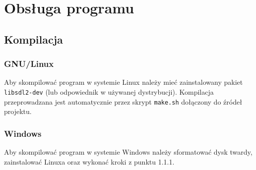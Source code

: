 \documentclass[12pt,a4paper]{article}
\newcommand{\code}[1]{\texttt{#1}}
\begin{document}
	

	\section{Obsługa programu}
		\subsection{Kompilacja}
			\subsubsection{GNU/Linux}
				Aby skompilować program w systemie Linux należy mieć zainstalowany pakiet \code{libsdl2-dev} (lub odpowiednik w używanej dystrybucji).
				Kompilacja przeprowadzana jest automatycznie przez skrypt \code{make.sh} dołączony do źródeł projektu.
			\subsubsection{Windows}
				Aby skompilować program w systemie Windows należy sformatować dysk twardy, zainstalować Linuxa oraz wykonać kroki z punktu 1.1.1.
\end{document}
